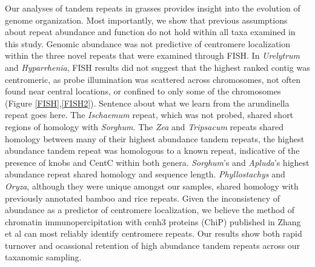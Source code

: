\documentclass[10pt,letterpaper]{article}
\newcommand{\pb}[1]{\todo[size=\scriptsize, color=Bittersweet]{#1}} %
\begin{document}
Our analyses of tandem repeats in grasses provides insight into the evolution of genome organization.
Most importantly, we show that previous assumptions about repeat abundance and function do not hold within all taxa examined in this study.
Genomic abundance was not predictive of centromere localization within the three novel repeats that were examined through FISH.
In \emph{Urelytrum} and \emph{Hyparrhenia}, FISH results did not suggest that the highest ranked contig was centromeric, as probe illumination was scattered across chromosomes, not often found near central locations, or confined to only some of the chromosomes (Figure \ref{FISH},\ref{FISH2}).
Sentence about what we learn from the arundinella repeat goes here.
The \emph{Ischaemum} repeat, which was not probed, shared short regions of homology with \emph{Sorghum}.
The \emph{Zea} and \emph{Tripsacum} repeats shared homology between many of their highest abundance tandem repeats, the highest abundance tandem repeat was homologous to a known repeat, indicative of the presence of knobs and CentC within both genera.
\emph{Sorghum}'s and \emph{Apluda}'s highest abundance repeat shared homology and sequence length. 
\emph{Phyllostachys} and \emph{Oryza}, although they were unique amongst our samples, shared homology with previously annotated bamboo and rice repeats.
Given the inconsistency of abundance as a predictor of centromere localization, we believe the method of chromatin immunopercipitation with cenh3 proteins (ChiP) published in Zhang et al \cite{zhang2014boom} can most reliably identify centromere repeats.
Our results show both rapid turnover and ocassional retention of high abundance tandem repeats across our taxanomic sampling.
\end{document}
